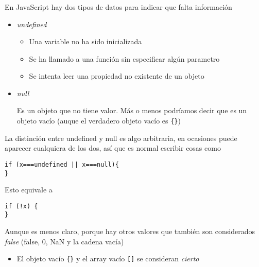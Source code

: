 \documentclass[ucs]{beamer}
\begin{document}
\begin{frame}[fragile]
\frametitle{}

En JavaScript hay dos tipos de datos para indicar que falta información

    \begin{itemize}
    \item
\emph{undefined}


    \begin{itemize}
    \item
Una variable no ha sido inicializada
    \item
Se ha llamado a una función sin especificar algún parametro
    \item
Se intenta leer una propiedad no existente de un objeto
    \end{itemize}


    \item
\emph{null}

Es un objeto que no tiene valor. Más o menos podríamos decir que es un objeto vacío
(auque el verdadero objeto vacío es \verb|{}|)

    \end{itemize}





\end{frame}

\begin{frame}[fragile]



La distinción entre undefined y null es algo arbitraria, en ocasiones
puede aparecer cualquiera de los dos, así que es normal escribir cosas como

  \begin{scriptsize}
  \begin{verbatim}
if (x===undefined || x===null){
}
  \end{verbatim}
  \end{scriptsize}
Esto equivale a
  \begin{scriptsize}
  \begin{verbatim}
if (!x) {
}
  \end{verbatim}
  \end{scriptsize}

Aunque es menos claro, porque hay otros valores que también son
considerados \emph{false} (false, 0, NaN y la cadena vacía)

    \begin{itemize}
    \item
El objeto vacío \verb|{}| y el array vacío \verb|[]| se consideran \emph{cierto}
    \end{itemize}


\end{frame}
\end{document}
